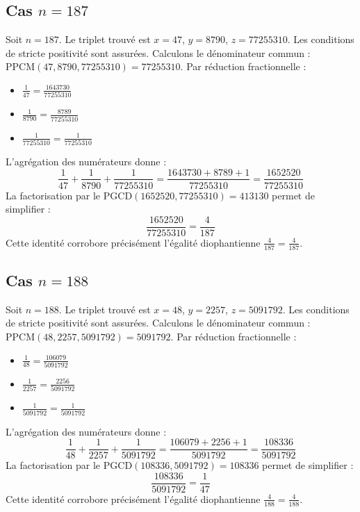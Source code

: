 \documentclass[11pt,a4paper]{article}
\begin{document}
\subsection{Cas $n = 187$}
Soit $n = 187$. Le triplet trouvé est $x = 47$, $y = 8790$, $z = 77255310$.
Les conditions de stricte positivité sont assurées.
Calculons le dénominateur commun : $\text{PPCM}(47, 8790, 77255310) = 77255310$.
Par réduction fractionnelle :
\begin{itemize}
    \item $\frac{1}{47} = \frac{1643730}{77255310}$
    \item $\frac{1}{8790} = \frac{8789}{77255310}$
    \item $\frac{1}{77255310} = \frac{1}{77255310}$
\end{itemize}
L'agrégation des numérateurs donne :
$$ \frac{1}{47} + \frac{1}{8790} + \frac{1}{77255310} = \frac{1643730 + 8789 + 1}{77255310} = \frac{1652520}{77255310} $$
La factorisation par le $\text{PGCD}(1652520, 77255310) = 413130$ permet de simplifier :
$$ \frac{1652520}{77255310} = \frac{4}{187} $$
Cette identité corrobore précisément l'égalité diophantienne $\frac{4}{187} = \frac{4}{187}$.

\subsection{Cas $n = 188$}
Soit $n = 188$. Le triplet trouvé est $x = 48$, $y = 2257$, $z = 5091792$.
Les conditions de stricte positivité sont assurées.
Calculons le dénominateur commun : $\text{PPCM}(48, 2257, 5091792) = 5091792$.
Par réduction fractionnelle :
\begin{itemize}
    \item $\frac{1}{48} = \frac{106079}{5091792}$
    \item $\frac{1}{2257} = \frac{2256}{5091792}$
    \item $\frac{1}{5091792} = \frac{1}{5091792}$
\end{itemize}
L'agrégation des numérateurs donne :
$$ \frac{1}{48} + \frac{1}{2257} + \frac{1}{5091792} = \frac{106079 + 2256 + 1}{5091792} = \frac{108336}{5091792} $$
La factorisation par le $\text{PGCD}(108336, 5091792) = 108336$ permet de simplifier :
$$ \frac{108336}{5091792} = \frac{1}{47} $$
Cette identité corrobore précisément l'égalité diophantienne $\frac{4}{188} = \frac{4}{188}$.
\end{document}
